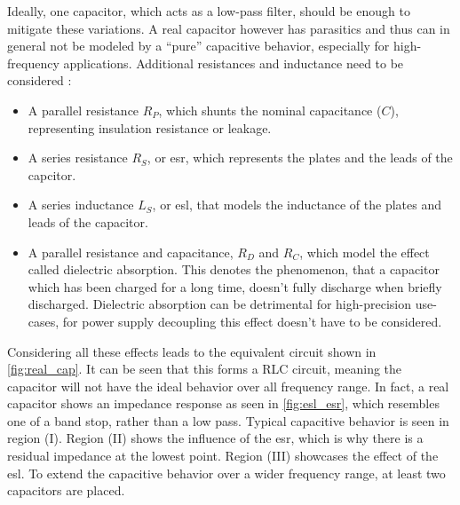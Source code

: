 Ideally, one capacitor, which acts as a low-pass filter, should be enough to mitigate these variations.
A real capacitor however has parasitics and thus can in general not be modeled by a ``pure'' capacitive behavior, especially for high-frequency applications. %
Additional resistances and inductance need to be considered \cite{decouple}:
\begin{itemize}
	\item A parallel resistance $R_P$, which shunts the nominal capacitance ($C$), representing insulation resistance or leakage.
	\item A series resistance $R_S$, or \gls{esr}, which represents the plates and the leads of the capcitor.
	\item A series inductance $L_S$, or \gls{esl}, that models the inductance of the plates and leads of the capacitor.
	\item A parallel resistance and capacitance, $R_D$ and $R_C$, which model the effect called dielectric absorption. This denotes the phenomenon, that a capacitor which has been charged for a long time, doesn't fully discharge when briefly discharged. Dielectric absorption can be detrimental for high-precision use-cases, for power supply decoupling this effect doesn't have to be considered.
\end{itemize}
Considering all these effects leads to the equivalent circuit shown in \autoref{fig:real_cap}.
It can be seen that this forms a RLC circuit, meaning the capacitor will not have the ideal behavior over all frequency range. In fact, a real capacitor shows an impedance response as seen in \autoref{fig:esl_esr}, which resembles one of a band stop, rather than a low pass.
Typical capacitive behavior is seen in region (I).
Region (II) shows the influence of the \gls{esr}, which is why there is a residual impedance at the lowest point.
Region (III) showcases the effect of the \gls{esl}. 
To extend the capacitive behavior over a wider frequency range, at least two capacitors are placed.

